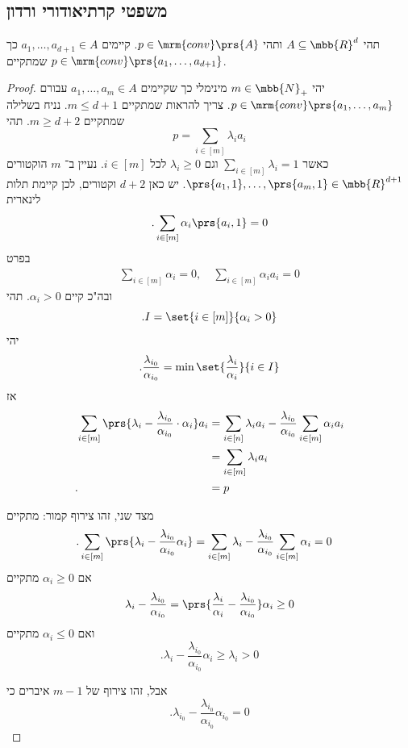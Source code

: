 \documentclass[a4paper,10pt,twoside,openany]{book}
\begin{document}
\subsection{משפטי קרתיאודורי ורדון}

\begin{theorem}[קרתיאודורי]\label{theorem:caratheodory}
תהי
$A \subseteq \mbb{R}^d$
ותהי
$p \in \mrm{conv}\prs{A}$.
קיימים
$a_1, \ldots, a_{d+1} \in A$
כך שמתקיים
$p \in \mrm{conv}\prs{a_1, \ldots, a_{d+1}}$.
\end{theorem}

\begin{proof}
יהי
$m \in \mbb{N}_+$
מינימלי כך שקיימים
$a_1, \ldots, a_m \in A$
עבורם
$p \in \mrm{conv}\prs{a_1, \ldots, a_m}$.
צריך להראות שמתקיים
$m \leq d+1$.
נניח בשלילה שמתקיים
$m \geq d+2$.
תהי
\[p = \sum_{i \in [m]} \lambda_i a_i\]
כאשר
$\sum_{i \in [m]} \lambda_i = 1$
וגם
$\lambda_i \geq 0$
לכל
$i \in [m]$.
נעיין ב־%
$m$
הוקטורים
$\prs{a_1, 1}, \ldots, \prs{a_m, 1} \in \mbb{R}^{d+1}$.
יש כאן
$d+2$
וקטורים, לכן קיימת תלות לינארית
\[\text{.} \sum_{i \in [m]} \alpha_i \prs{a_i,1} = 0\]
בפרט
\begin{align*}
\sum_{i \in [m]} \alpha_i = 0, \quad \sum_{i \in [m]} \alpha_i a_i = 0
\end{align*}
ובה"כ קיים
$\alpha_i > 0$.
תהי
\[\text{.} I = \set{i \in [m]}{\alpha_i > 0}\]
יהי
\[\text{.} \frac{\lambda_{i_0}}{\alpha_{i_0}} = \min\set{\frac{\lambda_i}{\alpha_i}}{i \in I}\]
אז
\begin{align*}
\sum_{i \in [m]} \prs{\lambda_i - \frac{\lambda_{i_0}}{\alpha_{i_0}} \cdot \alpha_i} a_i
&= \sum_{i \in [n]} \lambda_i a_i - \frac{\lambda_{i_0}}{\alpha_{i_0}} \sum_{i \in [m]} \alpha_i a_i
\\&= \sum_{i \in [m]} \lambda_i a_i
\\ \text{.} \hphantom{\sum_{i \in [m]} \prs{\lambda_i - \frac{\lambda_{i_0}}{\alpha_{i_0}} \cdot \alpha_i} a_i} &= p
\end{align*}

מצד שני, זהו צירוף קמור:
מתקיים
\begin{align*}
\text{.} \sum_{i\in[m]} \prs{\lambda_i - \frac{\lambda_{i_0}}{\alpha_{i_0}} \alpha_i}
&= \sum_{i \in [m]} \lambda_i - \frac{\lambda_{i_0}}{\alpha_{i_0}} \sum_{i \in [m]} \alpha_i = 0
\end{align*}
אם
$\alpha_i \geq 0$
מתקיים
\[ \lambda_i - \frac{\lambda_{i_0}}{\alpha_{i_0}} = \prs{\frac{\lambda_i}{\alpha_i} - \frac{\lambda_{i_0}}{\alpha_{i_0}}} \alpha_i \geq 0\]
ואם
$\alpha_i \leq 0$
מתקיים
\[\text{.} \lambda_i - \frac{\lambda_{i_0}}{\alpha_{i_0}} \alpha_i \geq \lambda_i > 0\]

 אבל, זהו צירוף של
$m-1$
איברים כי
\[\text{.} \lambda_{i_0} - \frac{\lambda_{i_0}}{\alpha_{i_0}} \alpha_{i_0} = 0\]
\end{proof}
\end{document}
